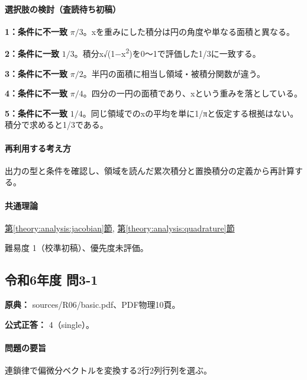 \paragraph{選択肢の検討（査読待ち初稿）}\mbox{}\par

\noindent\textbf{1：条件に不一致} \(\pi/3\)。xを重みにした積分は円の角度や単なる面積と異なる。\par

\noindent\textbf{2：条件に一致} \(1/3\)。積分x√(1−x\textsuperscript{2})を0〜1で評価した1/3に一致する。\par

\noindent\textbf{3：条件に不一致} \(\pi/2\)。半円の面積に相当し領域・被積分関数が違う。\par

\noindent\textbf{4：条件に不一致} \(\pi/4\)。四分の一円の面積であり、xという重みを落としている。\par

\noindent\textbf{5：条件に不一致} \(1/4\)。同じ領域でのxの平均を単に1/πと仮定する根拠はない。積分で求めると1/3である。\par

\paragraph{再利用する考え方} 出力の型と条件を確認し、領域を読んだ累次積分と置換積分の定義から再計算する。

\paragraph{共通理論} \hyperref[theory:analysis:jacobian]{第\ref*{theory:analysis:jacobian}節}, \hyperref[theory:analysis:quadrature]{第\ref*{theory:analysis:quadrature}節}

\par 難易度 1（校準初稿）、優先度未評価。

\subsection{令和6年度 問3-1}
\label{q:r06-reg-basic-3-1}

\noindent\textbf{原典：} sources/R06/basic.pdf、PDF物理10頁。

\textbf{公式正答：} 4（single）。

\paragraph{問題の要旨} 連鎖律で偏微分ベクトルを変換する2行2列行列を選ぶ。

